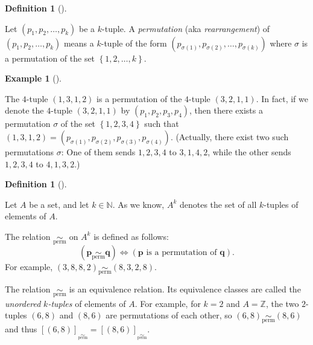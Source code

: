 \documentclass[numbers=enddot,12pt,final,onecolumn,notitlepage]{scrartcl}%
\numberwithin{exer}{subsection}
\theoremstyle{definition}
\newtheorem{defi}[theo]{Definition}
\newenvironment{definition}[1][]
{\begin{defi}[#1]\begin{leftbar}}
{\end{leftbar}\end{defi}}
\newtheorem{exam}[theo]{Example}
\newenvironment{example}[1][]
{\begin{exam}[#1]\begin{leftbar}}
{\end{leftbar}\end{exam}}
\begin{document}
\begin{definition}
Let $\left(  p_{1},p_{2},\ldots,p_{k}\right)  $ be a $k$-tuple. A
\textit{permutation} (aka \textit{rearrangement}) of $\left(  p_{1}%
,p_{2},\ldots,p_{k}\right)  $ means a $k$-tuple of the form $\left(
p_{\sigma\left(  1\right)  },p_{\sigma\left(  2\right)  },\ldots
,p_{\sigma\left(  k\right)  }\right)  $ where $\sigma$ is a permutation of the
set $\left\{  1,2,\ldots,k\right\}  $.
\end{definition}

\begin{example}
The $4$-tuple $\left(  1,3,1,2\right)  $ is a permutation of the $4$-tuple
$\left(  3,2,1,1\right)  $. In fact, if we denote the $4$-tuple $\left(
3,2,1,1\right)  $ by $\left(  p_{1},p_{2},p_{3},p_{4}\right)  $, then there
exists a permutation $\sigma$ of the set $\left\{  1,2,3,4\right\}  $ such
that $\left(  1,3,1,2\right)  =\left(  p_{\sigma\left(  1\right)  }%
,p_{\sigma\left(  2\right)  },p_{\sigma\left(  3\right)  },p_{\sigma\left(
4\right)  }\right)  $. (Actually, there exist two such permutations $\sigma$:
One of them sends $1,2,3,4$ to $3,1,4,2$, while the other sends $1,2,3,4$ to
$4,1,3,2$.)
\end{example}

\begin{definition}
Let $A$ be a set, and let $k\in\mathbb{N}$. As we know, $A^{k}$ denotes the
set of all $k$-tuples of elements of $A$.

The relation $\underset{\operatorname*{perm}}{\sim}$ on $A^{k}$ is defined as
follows:%
\[
\left(  \mathbf{p}\underset{\operatorname*{perm}}{\sim}\mathbf{q}\right)
\Longleftrightarrow\left(  \mathbf{p}\text{ is a permutation of }%
\mathbf{q}\right)  .
\]
For example, $\left(  3,8,8,2\right)  \underset{\operatorname*{perm}}{\sim
}\left(  8,3,2,8\right)  $.

The relation $\underset{\operatorname*{perm}}{\sim}$ is an equivalence
relation. Its equivalence classes are called the \textit{unordered }%
$k$\textit{-tuples} of elements of $A$. For example, for $k=2$ and
$A=\mathbb{Z}$, the two $2$-tuples $\left(  6,8\right)  $ and $\left(
8,6\right)  $ are permutations of each other, so $\left(  6,8\right)
\underset{\operatorname*{perm}}{\sim}\left(  8,6\right)  $ and thus $\left[
\left(  6,8\right)  \right]  _{\underset{\operatorname*{perm}}{\sim}}=\left[
\left(  8,6\right)  \right]  _{\underset{\operatorname*{perm}}{\sim}}$.
\end{definition}
\end{document}
